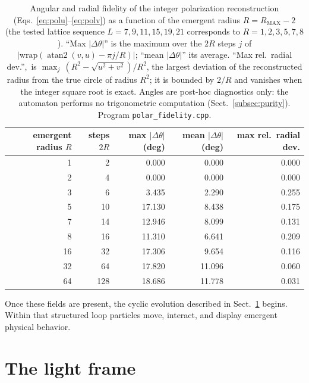 \documentclass[a4paper]{article}
\renewcommand{\arraystretch}{1.5}
\begin{document}
\begin{table}[htbp]
\centering
\caption{Angular and radial fidelity of the integer polarization reconstruction (Eqs.~\eqref{eq:polu}--\eqref{eq:polv}) as a function of the emergent radius $R=R_{\mathrm{MAX}}-2$ (the tested lattice sequence $L=7,9,11,15,19,21$ corresponds to $R=1,2,3,5,7,8$).  ``Max $|\Delta\theta|$'' is the maximum over the $2R$ steps $j$ of $\lvert\mathrm{wrap}(\operatorname{atan2}(v,u)-\pi j/R)\rvert$; ``mean $|\Delta\theta|$'' its average.  ``Max rel.\ radial dev.'',\ is $\max_{j}\,(R^{2}-\sqrt{u^{2}+v^{2}})/R^{2}$, the largest deviation of the reconstructed radius from the true circle of radius $R^{2}$; it is bounded by $2/R$ and vanishes when the integer square root is exact.  Angles are post-hoc diagnostics only: the automaton performs no trigonometric computation (Sect.~\ref{subsec:purity}).  Program \texttt{polar\_fidelity.cpp}.}
\label{tab:polar-fidelity}
\renewcommand{\arraystretch}{1.2}
\begin{tabular}{|r|r|r|r|r|}
\hline
emergent radius $R$ & steps $2R$ & max $|\Delta\theta|$ (deg) & mean $|\Delta\theta|$ (deg) & max rel.\ radial dev.\\
\hline
1 & 2 & 0.000 & 0.000 & 0.000\\
2 & 4 & 0.000 & 0.000 & 0.000\\
3 & 6 & 3.435 & 2.290 & 0.255\\
5 & 10 & 17.130 & 8.438 & 0.175\\
7 & 14 & 12.946 & 8.099 & 0.131\\
8 & 16 & 11.310 & 6.641 & 0.209\\
16 & 32 & 17.306 & 9.654 & 0.116\\
32 & 64 & 17.820 & 11.096 & 0.060\\
64 & 128 & 18.686 & 11.778 & 0.031\\
\hline
\end{tabular}
\end{table}

Once these fields are present, the cyclic evolution described in Sect.~\ref{sec:light-frame} begins.  Within that structured loop particles move, interact, and display emergent physical behavior.

\section{The light frame}\label{sec:light-frame}
\end{document}
